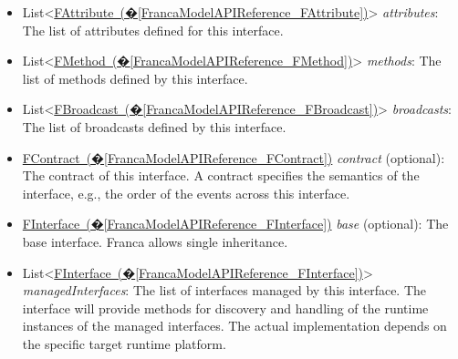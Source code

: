 \documentclass[a4paper,10pt]{scrreprt}
\newlength{\XdocItemIndent}
\begin{document}
\begin{itemize}
\begin{minipage}[t]{\XdocItemIndent}
\end{minipage}
\item \begin{minipage}[t]{\XdocItemIndent}
List<\hyperref[FrancaModelAPIReference_FAttribute]{FAttribute~(�\ref*{FrancaModelAPIReference_FAttribute})}> \textit{attributes}: The list of attributes defined for this interface.

\end{minipage}
\item \begin{minipage}[t]{\XdocItemIndent}
List<\hyperref[FrancaModelAPIReference_FMethod]{FMethod~(�\ref*{FrancaModelAPIReference_FMethod})}> \textit{methods}: The list of methods defined by this interface.

\end{minipage}
\item \begin{minipage}[t]{\XdocItemIndent}
List<\hyperref[FrancaModelAPIReference_FBroadcast]{FBroadcast~(�\ref*{FrancaModelAPIReference_FBroadcast})}> \textit{broadcasts}: The list of broadcasts defined by this interface.

\end{minipage}
\item \begin{minipage}[t]{\XdocItemIndent}
\hyperref[FrancaModelAPIReference_FContract]{FContract~(�\ref*{FrancaModelAPIReference_FContract})} \textit{contract} (optional): The contract of this interface. A contract specifies the semantics of the interface, e.g., the order of the events across this interface.

\end{minipage}
\item \begin{minipage}[t]{\XdocItemIndent}
\hyperref[FrancaModelAPIReference_FInterface]{FInterface~(�\ref*{FrancaModelAPIReference_FInterface})} \textit{base} (optional): The base interface. Franca allows single inheritance.

\end{minipage}
\item \begin{minipage}[t]{\XdocItemIndent}
List<\hyperref[FrancaModelAPIReference_FInterface]{FInterface~(�\ref*{FrancaModelAPIReference_FInterface})}> \textit{managedInterfaces}: The list of interfaces managed by this interface. The interface will provide methods for discovery and handling of the runtime instances of the managed interfaces. The actual implementation depends on the specific target runtime platform.

\end{minipage}
\end{itemize}
\addtolength{\XdocItemIndent}{2.5em}
\end{document}
